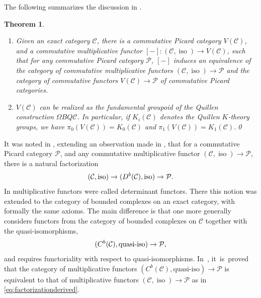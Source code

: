 \documentclass[11pt]{article}
\newcommand{\skpt}{\smallskip}
\theoremstyle{plain}
\newtheorem{theorem}{Theorem}[section]
\theoremstyle{definition}
\newcommand{\Ccal}{\mathcal C}
\newcommand{\Pcal}{\mathcal P}
\DeclareMathOperator{\iso}{iso}
\begin{document}
The following summarizes the discussion in \cite[]{Deligne-determinant}.

\skpt
\begin{theorem}\label{thm:delignevirtual}
\begin{enumerate}
\item Given an exact category $\Ccal$, there is a commutative Picard category $V(\Ccal)$, and a commutative multiplicative functor $[-]\colon(\Ccal, \iso) \to V(\Ccal)$, such that for any commutative Picard category $\Pcal$, $[-]$ induces an equivalence of the category of commutative multiplicative functors $(\Ccal, \iso) \to \Pcal$ and the category of commutative functors $V(\Ccal) \to \Pcal$ of commutative Picard categories.
\item $V(\Ccal)$ can be realized as the fundamental groupoid of the Quillen construction $\Omega BQ\Ccal$. In particular, if $K_i(\Ccal)$ denotes the Quillen $K$-theory groups, we have $\pi_0(V(\Ccal)) = K_0(\Ccal)$ and $\pi_1(V(\Ccal)) = K_1(\Ccal)$.\qed
\end{enumerate}
\end{theorem}

It was noted in \cite[]{Deligne-determinant}, extending an observation made in \cite{KnudsenMumford}, that for a commutative Picard category $\Pcal$, and any commutative multiplicative functor $(\Ccal, \iso) \to \Pcal$, there is a natural factorization\vspace*{-3pt}
\begin{equation}\label{eq:factorizationderived}
(\Ccal, \iso) \to (D^b(\Ccal), \hbox{iso}) \to \Pcal.
\end{equation}
In \cite{Knudsen} multiplicative functors were called determinant functors. There this notion was extended to the category of bounded complexes on an exact category, with formally the same axioms. The main difference is that one more generally considers functors from the category of bounded complexes on $\Ccal$ together with the quasi-isomorphisms,
\begin{displaymath}
(C^b(\Ccal), \hbox{quasi-iso}) \to \Pcal,
\end{displaymath}
and requires functoriality with respect to quasi-isomorphisms. In~\cite[Th.\,2.3]{Knudsen}, it~is~proved that the category of multiplicative functors \hbox{$(C^b(\Ccal), \text{quasi-iso})\!\to\! \Pcal$} is equivalent to that of multiplicative functors $(\Ccal, \iso) \to \Pcal$ as in \eqref{eq:factorizationderived}.
\end{document}
